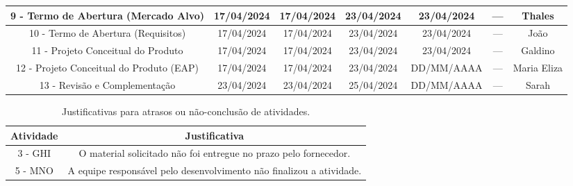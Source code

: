 \begin{landscape}
\begin{table}[htpb]
\begin{center}
\begin{tabular}{|c|c|c|c|c|c|c|}
9 - Termo de Abertura (Mercado 
Alvo)                       & 17/04/2024               & 17/04/2024                & 23/04/2024               & 23/04/2024                & ---                           & Thales \\ \hline
10 - Termo de Abertura (Requisitos)                       & 17/04/2024               & 17/04/2024                & 23/04/2024               & 23/04/2024                & ---                           & João \\ \hline
11 - Projeto Conceitual do Produto                       & 17/04/2024               & 17/04/2024                & 23/04/2024               & 23/04/2024                & ---                           & Galdino \\ \hline
12 - Projeto Conceitual do Produto (EAP)                      & 17/04/2024               & 17/04/2024                & 23/04/2024               & DD/MM/AAAA                & ---                           & Maria Eliza \\ \hline
13 - Revisão e Complementação                      & 23/04/2024               & 23/04/2024                & 25/04/2024               & DD/MM/AAAA                & ---                           & Sarah \\ \hline
\end{tabular}
\end{center}
\end{table}



\begin{table}[htpb]
\begin{center}
\caption{Justificativas para atrasos ou não-conclusão de atividades.}
\begin{tabular}{|c|c|} \hline
\textbf{Atividade} & \textbf{Justificativa}  \\ \hline 
    3 - GHI &
    O material solicitado não foi entregue no prazo pelo fornecedor. \\ \hline
    5 - MNO &
    A equipe responsável pelo desenvolvimento não finalizou a atividade. \\ \hline
\end{tabular}
\end{center}
\end{table}





\end{landscape}
